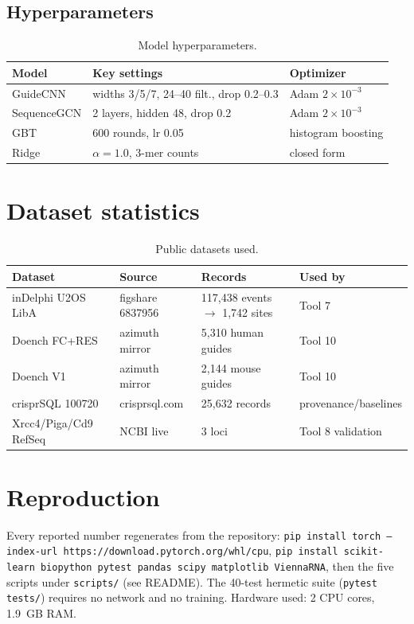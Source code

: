\documentclass[12pt]{article}
\begin{document}
\subsection{Hyperparameters}
\begin{table}[h]\centering
\caption{Model hyperparameters.}\label{tab:hp}
\begin{tabular}{lll}\hline\hline
Model & Key settings & Optimizer \\\hline
GuideCNN & widths 3/5/7, 24--40 filt., drop 0.2--0.3 & Adam $2\times10^{-3}$ \\
SequenceGCN & 2 layers, hidden 48, drop 0.2 & Adam $2\times10^{-3}$ \\
GBT & 600 rounds, lr 0.05 & histogram boosting \\
Ridge & $\alpha=1.0$, 3-mer counts & closed form \\\hline\hline
\end{tabular}
\end{table}

\section{Dataset statistics}
\begin{table}[h]\centering
\caption{Public datasets used.}\label{tab:data}
\begin{tabular}{llll}\hline\hline
Dataset & Source & Records & Used by \\\hline
inDelphi U2OS LibA & figshare 6837956 & 117,438 events $\to$ 1,742 sites & Tool 7 \\
Doench FC+RES & azimuth mirror & 5,310 human guides & Tool 10 \\
Doench V1 & azimuth mirror & 2,144 mouse guides & Tool 10 \\
crisprSQL 100720 & crisprsql.com & 25,632 records & provenance/baselines \\
Xrcc4/Piga/Cd9 RefSeq & NCBI live & 3 loci & Tool 8 validation \\\hline\hline
\end{tabular}
\end{table}




\section{Reproduction}
Every reported number regenerates from the repository: \texttt{pip install
torch --index-url https://download.pytorch.org/whl/cpu}, \texttt{pip install
scikit-learn biopython pytest pandas scipy matplotlib ViennaRNA}, then the five
scripts under \texttt{scripts/} (see README). The 40-test hermetic suite
(\texttt{pytest tests/}) requires no network and no training. Hardware used:
2 CPU cores, 1.9~GB RAM.
\end{document}
